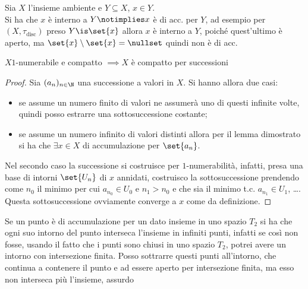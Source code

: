 

\begin{oss}
Sia $X$ l'insieme ambiente e $Y\subseteq X$, $x\in Y$.\\
Si ha che $x$ è interno a $Y \notimplies x$ è di acc. per $Y$, ad esempio per $(X, \tau_\text{disc})$ preso $Y\is\set{x}$ allora $x$ è interno a $Y$, poiché quest'ultimo è aperto, ma $\set{x}\setminus\set{x} = \nullset$ quindi non è di acc.
\end{oss}

\begin{prop}
$X 1$-numerabile e compatto $\implies X$ è compatto per successioni
\end{prop}
\begin{proof}
Sia $(a_n)_{n\in\N}$ una successione a valori in $X$. Si hanno allora due casi:
\begin{itemize}
\item se assume un numero finito di valori ne assumerà uno di questi infinite volte, quindi posso estrarre una sottosuccessione costante;
\item se assume un numero infinito di valori distinti allora per il lemma dimostrato si ha che $\exists x\in X$ di accumulazione per $\set{a_n}$.
\end{itemize}
Nel secondo caso la successione si costruisce per $1$-numerabilità, infatti, presa una base di intorni $\set{U_n}$ di $x$ \wlg annidati, costruisco la sottosuccessione prendendo come $n_0$ il minimo per cui $a_{n_0}\in U_0$ e $n_1 > n_0$ e che sia il minimo t.c. $a_{n_1}\in U_1$, \dots . Questa sottosuccessione ovviamente converge a $x$ come da definizione.
\end{proof}

\begin{oss}
Se un punto è di accumulazione per un dato insieme in uno spazio $T_2$ si ha che ogni suo intorno del punto interseca l'insieme in infiniti punti, infatti se così non fosse, usando il fatto che i punti sono chiusi in uno spazio $T_2$, potrei avere un intorno con intersezione finita. Posso sottrarre questi punti all'intorno, che continua a contenere il punto e ad essere aperto per intersezione finita, ma esso non interseca più l'insieme, assurdo
\end{oss}

